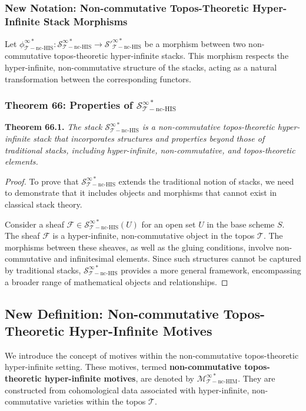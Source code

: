 \documentclass{article}
\begin{document}
\subsubsection{New Notation: Non-commutative Topos-Theoretic Hyper-Infinite Stack Morphisms}
Let \(\phi_{\mathcal{T}-\text{nc-HIS}}^{\infty *}: \mathcal{S}_{\mathcal{T}-\text{nc-HIS}}^{\infty *} \to \mathcal{S}'_{\mathcal{T}-\text{nc-HIS}}^{\infty *}\) be a morphism between two non-commutative topos-theoretic hyper-infinite stacks. This morphism respects the hyper-infinite, non-commutative structure of the stacks, acting as a natural transformation between the corresponding functors.

\subsubsection{Theorem 66: Properties of \(\mathcal{S}_{\mathcal{T}-\text{nc-HIS}}^{\infty *}\)}
\textbf{Theorem 66.1.} \textit{The stack \(\mathcal{S}_{\mathcal{T}-\text{nc-HIS}}^{\infty *}\) is a non-commutative topos-theoretic hyper-infinite stack that incorporates structures and properties beyond those of traditional stacks, including hyper-infinite, non-commutative, and topos-theoretic elements.}

\begin{proof}
To prove that \(\mathcal{S}_{\mathcal{T}-\text{nc-HIS}}^{\infty *}\) extends the traditional notion of stacks, we need to demonstrate that it includes objects and morphisms that cannot exist in classical stack theory.

Consider a sheaf \(\mathcal{F} \in \mathcal{S}_{\mathcal{T}-\text{nc-HIS}}^{\infty *}(U)\) for an open set \(U\) in the base scheme \(S\). The sheaf \(\mathcal{F}\) is a hyper-infinite, non-commutative object in the topos \(\mathcal{T}\). The morphisms between these sheaves, as well as the gluing conditions, involve non-commutative and infinitesimal elements. Since such structures cannot be captured by traditional stacks, \(\mathcal{S}_{\mathcal{T}-\text{nc-HIS}}^{\infty *}\) provides a more general framework, encompassing a broader range of mathematical objects and relationships.
\end{proof}

\subsection{New Definition: Non-commutative Topos-Theoretic Hyper-Infinite Motives}
We introduce the concept of motives within the non-commutative topos-theoretic hyper-infinite setting. These motives, termed \textbf{non-commutative topos-theoretic hyper-infinite motives}, are denoted by \(\mathcal{M}_{\mathcal{T}-\text{nc-HIM}}^{\infty *}\). They are constructed from cohomological data associated with hyper-infinite, non-commutative varieties within the topos \(\mathcal{T}\).
\end{document}

